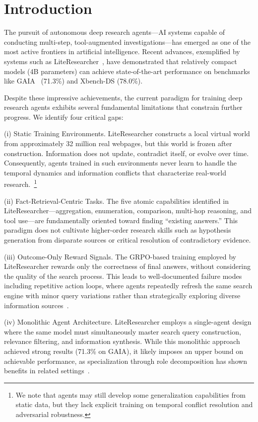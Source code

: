 \documentclass[notspecified,article,accept,pdftex,moreauthors]{Definitions/mdpi}
\renewcommand{\textbf}[1]{#1}
\begin{document}
\section{Introduction}
\label{sec:intro}
The pursuit of autonomous deep research agents---AI systems capable of conducting multi-step, tool-augmented investigations---has emerged as one of the most active frontiers in artificial intelligence. Recent advances, exemplified by systems such as LiteResearcher~\cite{b1}, have demonstrated that relatively compact models (4B parameters) can achieve state-of-the-art performance on benchmarks like GAIA~\cite{b2} (71.3\%) and Xbench-DS (78.0\%).

Despite these impressive achievements, the current paradigm for training deep research agents exhibits several fundamental limitations that constrain further progress. We identify four critical gaps:

\textbf{(i) Static Training Environments.} LiteResearcher constructs a local virtual world from approximately 32 million real webpages, but this world is frozen after construction. Information does not update, contradict itself, or evolve over time. Consequently, agents trained in such environments never learn to handle the temporal dynamics and information conflicts that characterize real-world research.~\footnote{We note that agents may still develop some generalization capabilities from static data, but they lack explicit training on temporal conflict resolution and adversarial robustness.}

\textbf{(ii) Fact-Retrieval-Centric Tasks.} The five atomic capabilities identified in LiteResearcher---aggregation, enumeration, comparison, multi-hop reasoning, and tool use---are fundamentally oriented toward finding ``existing answers.'' This paradigm does not cultivate higher-order research skills such as hypothesis generation from disparate sources or critical resolution of contradictory evidence.

\textbf{(iii) Outcome-Only Reward Signals.} The GRPO-based training employed by LiteResearcher rewards only the correctness of final answers, without considering the quality of the search process. This leads to well-documented failure modes including repetitive action loops, where agents repeatedly refresh the same search engine with minor query variations rather than strategically exploring diverse information sources~\cite{b1}.

\textbf{(iv) Monolithic Agent Architecture.} LiteResearcher employs a single-agent design where the same model must simultaneously master search query construction, relevance filtering, and information synthesis. While this monolithic approach achieved strong results (71.3\% on GAIA), it likely imposes an upper bound on achievable performance, as specialization through role decomposition has shown benefits in related settings~\cite{b47,b48}.
\end{document}

